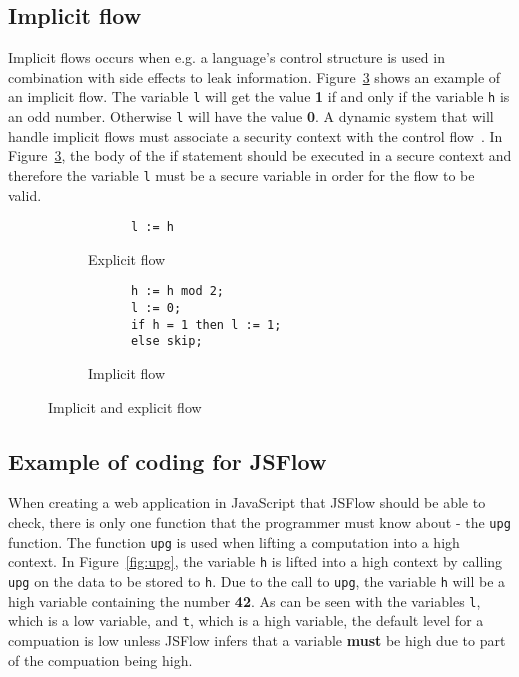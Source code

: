 \subsection{Implicit flow}
\label{chapter:implicit_flow}
Implicit flows occurs when e.g. a language's control structure is used in combination with side effects to leak information. Figure~\ref{fig:impflow} shows an example of an implicit flow. The variable {\tt l} will get the value \textbf{1} if and only if the variable {\tt h} is an odd number. Otherwise {\tt l} will have the value \textbf{0}. A dynamic system that will handle implicit flows must associate a security context with the control flow~\cite{jsflow-csf12}. In Figure~\ref{fig:impflow}, the body of the if statement should be executed in a secure context and therefore the variable {\tt l} must be a secure variable in order for the flow to be valid.

\begin{figure}[h]
  \captionsetup[subfigure]{singlelinecheck=off,justification=raggedright}
  \begin{subfigure}[b]{0.5\textwidth}
    \begin{verbatim}
      l := h
    \end{verbatim}
    \caption{Explicit flow}
    \label{fig:expflow}
  \end{subfigure}
  \begin{subfigure}[b]{0.5\textwidth}
    \begin{verbatim}
      h := h mod 2;
      l := 0;
      if h = 1 then l := 1;
      else skip;
    \end{verbatim}
    \caption{Implicit flow}
    \label{fig:impflow}
  \end{subfigure}
  \caption{Implicit and explicit flow}
\end{figure}

\subsection{Example of coding for JSFlow}
When creating a web application in JavaScript that JSFlow should be able to check, there is only one function that the programmer must know about - the {\tt upg} function. The function {\tt upg} is used when lifting a computation into a high context. In Figure~\ref{fig:upg}, the variable {\tt h} is lifted into a high context by calling {\tt upg} on the data to be stored to {\tt h}. Due to the call to {\tt upg}, the variable {\tt h} will be a high variable containing the number \textbf{42}. As can be seen with the variables {\tt l}, which is a low variable, and {\tt t}, which is a high variable, the default level for a compuation is low unless JSFlow infers that a variable \textbf{must} be high due to part of the compuation being high.

